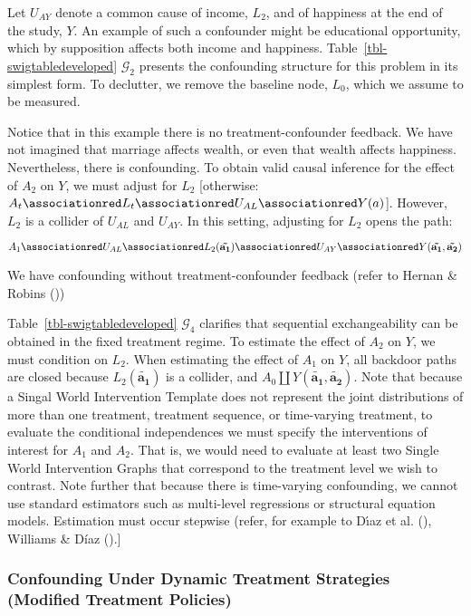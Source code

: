 \documentclass[
  single column]{article}
\begin{document}
Let \(U_{AY}\) denote a common cause of income, \(L_2\), and of
happiness at the end of the study, \(Y\). An example of such a
confounder might be educational opportunity, which by supposition
affects both income and happiness. Table~\ref{tbl-swigtabledeveloped}
\(\mathcal{G}_2\) presents the confounding structure for this problem in
its simplest form. To declutter, we remove the baseline node, \(L_0\),
which we assume to be measured.

Notice that in this example there is no treatment-confounder feedback.
We have not imagined that marriage affects wealth, or even that wealth
affects happiness. Nevertheless, there is confounding. To obtain valid
causal inference for the effect of \(A_2\) on \(Y\), we must adjust for
\(L_2\) {[}otherwise:
\(A_t\associationred L_t \associationred U_{AL}\associationred Y(a)\){]}.
However, \(L_2\) is a collider of \(U_{AL}\) and \(U_{AY}\). In this
setting, adjusting for \(L_2\) opens the path:

\[
A_1 \associationred U_{AL} \associationred L_2({\mathbf{\tilde{a_1}}})  \associationred U_{AY} \associationred Y({\mathbf{\tilde{a_1}, \tilde{a_2}}})
\]

We have confounding without treatment-confounder feedback (refer to
Hernan \& Robins ())

Table~\ref{tbl-swigtabledeveloped} \(\mathcal{G}_4\) clarifies that
sequential exchangeability can be obtained in the fixed treatment
regime. To estimate the effect of \(A_2\) on \(Y\), we must condition on
\(L_2\). When estimating the effect of \(A_1\) on \(Y\), all backdoor
paths are closed because \(L_2({\mathbf{\tilde{a_1}}})\) is a collider,
and \(A_0 \coprod Y({\mathbf{\tilde{a_1}, \tilde{a_2}}})\). Note that
because a Singal World Intervention Template does not represent the
joint distributions of more than one treatment, treatment sequence, or
time-varying treatment, to evaluate the conditional independences we
must specify the interventions of interest for \(A_1\) and \(A_2\). That
is, we would need to evaluate at least two Single World Intervention
Graphs that correspond to the treatment level we wish to contrast. Note
further that because there is time-varying confounding, we cannot use
standard estimators such as multi-level regressions or structural
equation models. Estimation must occur stepwise (refer, for example to
Dı́az et al. (), Williams \&
Díaz ().{]}

\subsubsection{Confounding Under Dynamic Treatment Strategies (Modified
Treatment
Policies)}\label{confounding-under-dynamic-treatment-strategies-modified-treatment-policies}
\end{document}
